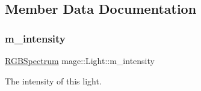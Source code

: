 \subsection{Member Data Documentation}
\hypertarget{classmage_1_1_light_a4ed8d43c8a4df71671a922d5f04974b8}{}\label{classmage_1_1_light_a4ed8d43c8a4df71671a922d5f04974b8} 
\subsubsection{\texorpdfstring{m\+\_\+intensity}{m\_intensity}}
{\footnotesize\ttfamily \hyperlink{structmage_1_1_r_g_b_spectrum}{R\+G\+B\+Spectrum} mage\+::\+Light\+::m\+\_\+intensity\hspace{0.3cm}{\ttfamily [private]}}

The intensity of this light. 